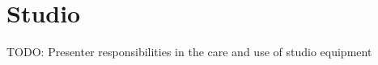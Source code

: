 \documentclass[../StudioOperationGuide.tex]{subfiles}
\begin{document}
\chapter{Studio}
TODO: Presenter responsibilities in the care and use of studio equipment
\end{document}
